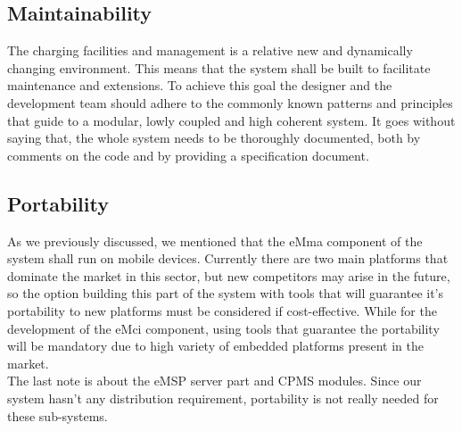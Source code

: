\subsection{Maintainability}
The charging facilities and management is a relative new and dynamically changing environment. This means that the system shall be built to facilitate maintenance and extensions. To achieve this goal the designer and the development team should adhere to the commonly known patterns and principles that guide to a modular, lowly coupled and high coherent system. It goes without saying that, the whole system needs to be thoroughly documented, both by comments on the code and by providing a specification document. %

\subsection{Portability}
As we previously discussed, we mentioned that the eMma component of the system shall run on mobile devices. Currently there are two main platforms that dominate the market in this sector, but new competitors may arise in the future, so the option building this part of the system with tools that will guarantee it's portability to new platforms must be considered if cost-effective. While for the development of the eMci component, using tools that guarantee the portability will be mandatory due to high variety of embedded platforms present in the market.\\
The last note is about the eMSP server part and CPMS modules. Since our system hasn't any distribution requirement, portability is not really needed for these sub-systems.